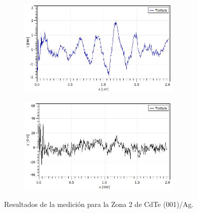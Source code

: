 \begin{figure}[H]
    \begin{subfigure}[b]{0.45\textwidth}
        \includegraphics[width = 0.85\textwidth]{figures/chap4/cdte-ag/afm-nsom-results/2um/CdTe_Ag_afm_profile.jpg}
    \end{subfigure}\hfill
    \begin{subfigure}[b]{0.45\textwidth}
        \includegraphics[width = 0.85\textwidth]{figures/chap4/cdte-ag/afm-nsom-results/2um/CdTe_Ag_nsom_profile.jpg}
    \end{subfigure}
\caption{Resultados de la medición para la Zona 2 de CdTe (001)/Ag.}
\label{fig:afm-nsom-results-2um}
\end{figure}

